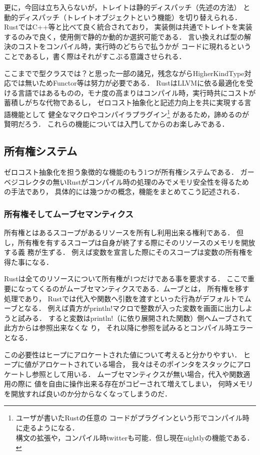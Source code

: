 更に，今回は立ち入らないが，トレイトは静的ディスパッチ（先述の方法）
と動的ディスパッチ（トレイトオブジェクトという機能）を切り替えられる．
RustではC++等と比べて良く統合されており，
実装側は共通でトレイトを実装するのみで良く，使用側で静的か動的か選択可能である．
言い換えれば型の解決のコストをコンパイル時，実行時のどちらで払うかが
コードに現れるということであるし，書く際はそれがすこぶる意識させられる．

ここまでで型クラスでは？と思った一部の諸兄，残念ながらHigherKindType対応では無いためFunctor等は努力が必要である．
RustはLLVMに依る最適化を受ける言語ではあるものの，モナ度の高まりはコンパイル時，実行時共にコストが蓄積しがちな代物であるし，
ゼロコスト抽象化と記述力向上を共に実現する言語機能として
健全なマクロやコンパイラプラグイン\footnote{ユーザが書いたRustの任意の
  コードがプラグインという形でコンパイル時に走るようになる． \\
  構文の拡張や，コンパイル時twitterも可能．但し現在nightlyの機能である．}
があるため，諦めるのが賢明だろう．
これらの機能については入門してからのお楽しみである．

\subsection{所有権システム}
ゼロコスト抽象化を担う象徴的な機能のもう1つが所有権システムである．
ガーベジコレクタの無いRustがコンパイル時の処理のみでメモリ安全性を得るための手法であり，
具体的には幾つかの概念，機能をまとめてこう記述される．

\subsubsection{所有権そしてムーブセマンティクス}
所有権とはあるスコープがあるリソースを所有し利用出来る権利である．
但し，所有権を有するスコープは自身が終了する際にそのリソースのメモリを開放する義
務が生ずる．
例えば変数を宣言した際にそのスコープは変数の所有権を得た事になる．

Rustは全てのリソースについて所有権が1つだけである事を要求する．
ここで重要になってくるのがムーブセマンティクスである．ムーブとは，
所有権を移す処理であり，
Rustでは代入や関数へ引数を渡すといった行為がデフォルトでムーブとなる．
例えば貴方がprintln!マクロで整数が入った変数を画面に出力しようと試みる．
すると変数はprintln!（に依り展開された関数）側へムーブされて此方からは参照出来なくな
り， それ以降に参照を試みるとコンパイル時エラーとなる．

この必要性はヒープにアロケートされた値について考えると分かりやすい．
ヒープに値がアロケートされている場合，
我々はそのポインタをスタックにアロケートし参照として用いる．
ムーブセマンティクスが無い場合，代入や関数適用の際に
値を自由に操作出来る存在がコピーされて増えてしまい，
何時メモリを開放すれば良いのか分からなくなってしまうのだ．

